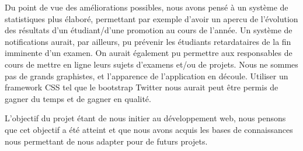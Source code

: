 \documentclass{report}
\begin{document}
        Du point de vue des améliorations possibles, nous avons pensé à un système 
    de statistiques plus élaboré, permettant par exemple d'avoir un apercu de
    l'évolution des résultats d'un étudiant/d'une promotion au cours de l'année.
    Un système de notifications aurait, par ailleurs, pu prévenir 
    les étudiants retardataires de la fin imminente d'un examen. On aurait 
    également pu permettre aux responsables de cours de mettre en ligne leurs 
    sujets d'examens et/ou de projets. Nous ne sommes pas de grands graphistes,
    et l'apparence de l'application en découle. Utiliser un framework CSS tel
    que le bootstrap Twitter nous aurait peut être permis de gagner du temps et
    de gagner en qualité.
    
        L'objectif du projet étant de nous initier au développement web, nous
    pensons que cet objectif a été atteint et que nous avons acquis les bases de
    connaissances nous permettant de nous adapter pour de futurs projets.
\end{document}

